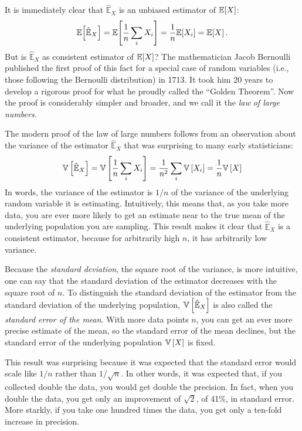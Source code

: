 It is immediately clear that $\hat{\mathbb{E}}_X$ is an unbiased estimator of $\mathbb{E}\!\left[{X}\right]$:
\begin{equation*}
    \mathbb{E}\!\left[{\hat{\mathbb{E}}_X}\right] = \mathbb{E}\!\left[{\frac{1}{n} \sum_i X_i}\right] = \frac{1}{n} \mathbb{E}\!\left[{X_i}\right] = \mathbb{E}\!\left[{X}\right].
\end{equation*}
But is $\hat{\mathbb{E}}_X$ as consistent estimator of $\mathbb{E}\!\left[{X}\right]$? The mathematician Jacob Bernoulli published the first proof of this fact for a special case of random variables (i.e., those following the Bernoulli distribution) in 1713. It took him 20 years to develop a rigorous proof for what he proudly called the ``Golden Theorem''. Now the proof is considerably simpler and broader, and we call it the \emph{law of large numbers}.

The modern proof of the law of large numbers follows from an observation about the variance of the estimator $\hat{\mathbb{E}}_X$ that was surprising to many early statisticians:
\begin{equation*}
    \mathbb{V}\left[{\hat{\mathbb{E}}_X}\right] = \mathbb{V}\left[{\frac{1}{n} \sum_i X_i}\right] = \frac{1}{n^2} \sum_i \mathbb{V}\left[{X_i}\right] = \frac{1}{n} \mathbb{V}\left[{X}\right]
\end{equation*}
In words, the variance of the estimator is $1/n$ of the variance of the underlying random variable it is estimating. Intuitively, this means that, as you take more data, you are ever more likely to get an estimate near to the true mean of the underlying population you are sampling. This result makes it clear that $\hat{\mathbb{E}}_X$ is a consistent estimator, because for arbitrarily high $n$, it has arbitrarily low variance.

Because the \emph{standard deviation}, the square root of the variance, is more intuitive, one can say that the standard deviation of the estimator decreases with the square root of $n$. To distinguish the standard deviation of the estimator from the standard deviation of the underlying population, $\mathbb{V}\left[{\hat{\mathbb{E}}_X}\right]$ is also called the \emph{standard error of the mean}. With more data points $n$, you can get an ever more precise estimate of the mean, so the standard error of the mean declines, but the standard error of the underlying population $\mathbb{V}\left[{X}\right]$ is fixed.

This result was surprising because it was expected that the standard error
would scale like $1/n$ rather than $1/\sqrt{n}$. In other words, it was
expected that, if you collected double the data, you would get double the
precision. In fact, when you double the data, you get only an improvement of $\sqrt{2}$,
of 41\%, in standard error. More starkly, if you take one hundred times the data, you get only
a ten-fold increase in precision.

